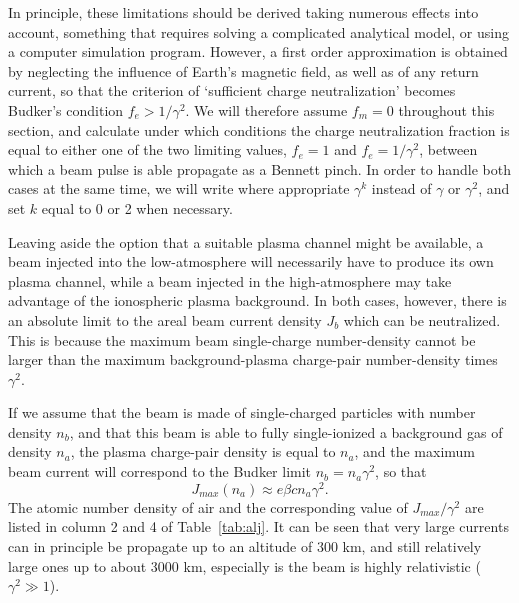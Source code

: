\documentclass [12pt,a4paper,     ]{report} %
\begin{document}
   In principle, these limitations should be derived taking numerous effects into account, something that requires solving a complicated analytical model, or using a computer simulation program.  However, a first order approximation is obtained by neglecting the influence of Earth's magnetic field, as well as of any return current, so that the criterion of `sufficient charge neutralization' becomes Budker's condition $f_e > 1/\gamma^2$.   We will therefore assume $f_m = 0$ throughout this section, and calculate under which conditions the charge neutralization fraction is equal to either one of the two limiting values, $f_e = 1$ and $f_e = 1/\gamma^2$, between which a beam pulse is able propagate as a Bennett pinch. In order to handle both cases at the same time, we will write where appropriate $\gamma^k$ instead of $\gamma$ or $\gamma^2$, and set $k$ equal to 0 or 2 when necessary.

  Leaving aside the option that a suitable plasma channel might be available, a beam injected into the low-atmosphere will necessarily have to produce its own plasma channel, while a beam injected in the high-atmosphere may take advantage of the ionospheric plasma background.  In both cases, however, there is an absolute limit to the areal beam current density $J_b$ which can be neutralized.  This is because the maximum beam single-charge number-density cannot be larger than the maximum background-plasma charge-pair number-density times $\gamma^2$.

   If we assume that the beam is made of single-charged particles with number density $n_b$, and that this beam is able to fully single-ionized a background gas of density $n_a$, the plasma charge-pair density is equal to $n_a$, and the maximum beam current will correspond to the Budker limit $n_b=n_a \gamma^2$, so that
%
\begin{equation}\label{cnc:1} %
                            J_{max}(n_a) \approx e \beta c n_a \gamma^2.
\end{equation}
%
The atomic number density of air and the corresponding value of $J_{max}/\gamma^2$ are listed in column 2 and 4 of Table~\ref{tab:alj}.  It can be seen that very large currents can in principle be propagate up to an altitude of 300 km, and still relatively large ones up to about 3000 km, especially is the beam is highly relativistic ($\gamma^2 \gg 1$).
\end{document}
